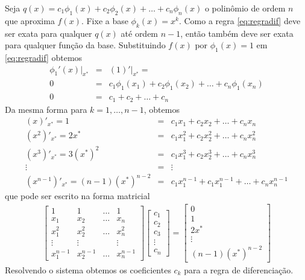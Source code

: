 Seja $q(x)=c_1\phi_1(x)+c_2\phi_2(x)+\ldots +c_n \phi_n(x)$ o polinômio de ordem $n$ que aproxima $f(x)$. Fixe a base $\phi_k(x)=x^k$. Como a regra \eqref{eq:regradif} deve ser exata para qualquer $q(x)$ até ordem $n-1$, então também deve ser exata para qualquer função da base. Substituindo $f(x)$ por $\phi_1(x)=1$ em \eqref{eq:regradif} obtemos
\begin{eqnarray}
\phi_1'(x)|_{x^*} &=& (1)'|_{x^*} = \\
            0   &=&  c_1\phi_1(x_1)+c_2\phi_1(x_2)+\ldots +c_n\phi_1(x_n) \\
            0   &=& c_1+c_2+\ldots +c_n
\end{eqnarray}
Da mesma forma para $k=1,\ldots ,n-1$, obtemos
\begin{eqnarray}
      (x)'_{x^*}  = 1            &=&  c_1x_1      +c_2x_2  +\ldots +c_nx_n \\
      (x^2)'_{x^*}= 2x^*         &=&  c_1x_1^2    +c_2x_2^2+\ldots +c_nx_n^2 \\
      (x^3)'_{x^*}= 3(x^*)^2     &=&  c_1x_1^3    +c_2x_2^3+\ldots +c_nx_n^3 \\
                    \vdots       &=&  \vdots        \\
      (x^{n-1})'_{x^*}= (n-1)(x^*)^{n-2} &=&  c_1x_1^{n-1}+c_1x_1^{n-1}+\ldots +c_nx_n^{n-1}
\end{eqnarray}
que pode ser escrito na forma matricial
\begin{eqnarray}
  \begin{bmatrix}
    1         & 1         & \ldots   & 1 \\
    x_1       & x_2       & \ldots   & x_n \\
    x_1^2     & x_2^2     & \ldots   & x_n^2 \\
    \vdots    & \vdots    &          & \vdots   \\
    x_1^{n-1} & x_2^{n-1} & \ldots   & x_n^{n-1}    
  \end{bmatrix}
  \begin{bmatrix}
    c_1 \\ c_2\\ c_3  \\ \vdots   \\ c_n
  \end{bmatrix}
=
\begin{bmatrix}
  0  \\ 1 \\ 2x^* \\ \vdots  \\ (n-1)(x^*)^{n-2}
\end{bmatrix}
\end{eqnarray}
Resolvendo o sistema obtemos os coeficientes $c_k$ para a regra de diferenciação.

